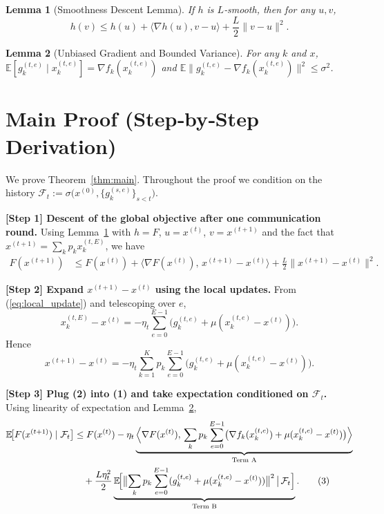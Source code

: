 \documentclass{article}
\newcommand{\E}{\mathbb{E}}
\newtheorem{lemma}{Lemma}
\begin{document}
\begin{lemma}[Smoothness Descent Lemma]\label{lem:smooth}
If $h$ is $L$‑smooth, then for any $u,v$,
\[
h(v)\le h(u)+\langle\nabla h(u),v-u\rangle+\frac{L}{2}\|v-u\|^2 .
\]
\end{lemma}

\begin{lemma}[Unbiased Gradient and Bounded Variance]\label{lem:unbiased}
For any $k$ and $x$, $\E[g_{k}^{(t,e)}\mid x_{k}^{(t,e)}]=\nabla f_k(x_{k}^{(t,e)})$ and
$\E\|g_{k}^{(t,e)}-\nabla f_k(x_{k}^{(t,e)})\|^2\le\sigma^2$.
\end{lemma}

\section*{Main Proof (Step‑by‑Step Derivation)}
We prove Theorem~\ref{thm:main}. Throughout the proof we condition on the history
$\mathcal{F}_t:=\sigma\bigl(x^{(0)},\{g_{k}^{(s,e)}\}_{s<t}\bigr)$.

\medskip
\noindent\textbf{[Step 1] Descent of the global objective after one communication round.}  
Using Lemma~\ref{lem:smooth} with $h=F$, $u=x^{(t)}$, $v=x^{(t+1)}$ and the fact that
$x^{(t+1)}=\sum_k p_k x_{k}^{(t,E)}$, we have
\begin{align}
F(x^{(t+1)}) 
&\le F(x^{(t)}) 
   +\bigl\langle\nabla F(x^{(t)}),\,x^{(t+1)}-x^{(t)}\bigr\rangle
   +\frac{L}{2}\|x^{(t+1)}-x^{(t)}\|^2 . \tag{1}
\end{align}

\medskip
\noindent\textbf{[Step 2] Expand $x^{(t+1)}-x^{(t)}$ using the local updates.}  
From (\ref{eq:local_update}) and telescoping over $e$,
\[
x_{k}^{(t,E)}-x^{(t)} 
 = -\eta_t\sum_{e=0}^{E-1}\bigl(g_{k}^{(t,e)}+\mu(x_{k}^{(t,e)}-x^{(t)})\bigr).
\]
Hence
\[
x^{(t+1)}-x^{(t)} = -\eta_t\sum_{k=1}^{K}p_k
      \sum_{e=0}^{E-1}\bigl(g_{k}^{(t,e)}+\mu(x_{k}^{(t,e)}-x^{(t)})\bigr). \tag{2}
\]

\medskip
\noindent\textbf{[Step 3] Plug (2) into (1) and take expectation conditioned on $\mathcal{F}_t$.}  
Using linearity of expectation and Lemma~\ref{lem:unbiased},
\begin{align}
\E\!\bigl[F(x^{(t+1)})\mid\mathcal{F}_t\bigr]
&\le F(x^{(t)}) 
   -\eta_t\underbrace{
      \Bigl\langle\nabla F(x^{(t)}),\,
      \sum_{k}p_k\sum_{e=0}^{E-1}
      \bigl(\nabla f_k(x_{k}^{(t,e)})+\mu(x_{k}^{(t,e)}-x^{(t)})\bigr)
      \Bigr\rangle}_{\text{Term A}}
   \nonumber\\
&\quad +\frac{L\eta_t^{2}}{2}\underbrace{
      \E\!\Bigl[\bigl\|
      \sum_{k}p_k\sum_{e=0}^{E-1}
      (g_{k}^{(t,e)}+\mu(x_{k}^{(t,e)}-x^{(t)}))
      \bigr\|^{2}
      \,\big|\,\mathcal{F}_t\Bigr]}_{\text{Term B}} .
\tag{3}
\end{align}
\end{document}
